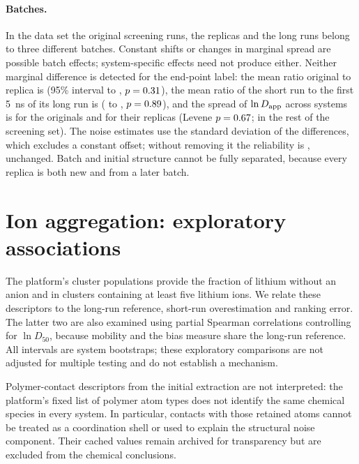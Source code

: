 \documentclass[11pt]{article}
\begin{document}
\paragraph{Batches.} In the data set the original screening runs, the replicas and the long runs
belong to three different batches. Constant shifts or changes in marginal spread are possible batch effects; system-specific
effects need not produce either. Neither marginal difference is detected for the end-point label: the mean ratio original
to replica is \techoEndBatchRepRatio{} (95\% interval \techoEndBatchRepRatioLo{} to
\techoEndBatchRepRatioHi, $p=0.31$), the mean ratio of the short run to the first
\SI{5}{\nano\second} of its long run is \techoEndBatchPrefRatio{} (\techoEndBatchPrefRatioLo{} to
\techoEndBatchPrefRatioHi, $p=0.89$), and the spread of $\ln D_{\mathrm{app}}$ across systems is
\techoEndBatchSdOrig{} for the originals and \techoEndBatchSdRep{} for their replicas (Levene
$p=0.67$; \techoEndBatchSdOther{} in the rest of the screening set). The noise
estimates use the standard deviation of the differences, which excludes a constant offset; without
removing it the reliability is \techoEndRelUncentred{}, unchanged. Batch and initial structure
cannot be fully separated, because every replica is both new and from a later batch.

\section{Ion aggregation: exploratory associations}\label{si:sec:solvation}
The platform's cluster populations provide the fraction of lithium without an anion and in
clusters containing at least five lithium ions. We relate these descriptors to the long-run
reference, short-run overestimation and ranking error. The latter two are also examined using
partial Spearman correlations controlling for $\ln D_{50}$, because mobility and the bias
measure share the long-run reference. All intervals are system bootstraps; these exploratory
comparisons are not adjusted for multiple testing and do not establish a mechanism.

Polymer-contact descriptors from the initial extraction are not interpreted: the platform's
fixed list of polymer atom types does not identify the same chemical species in every system.
In particular, contacts with those retained atoms cannot be treated as a coordination shell or
used to explain the structural noise component. Their cached values remain archived for
transparency but are excluded from the chemical conclusions.
\end{document}
